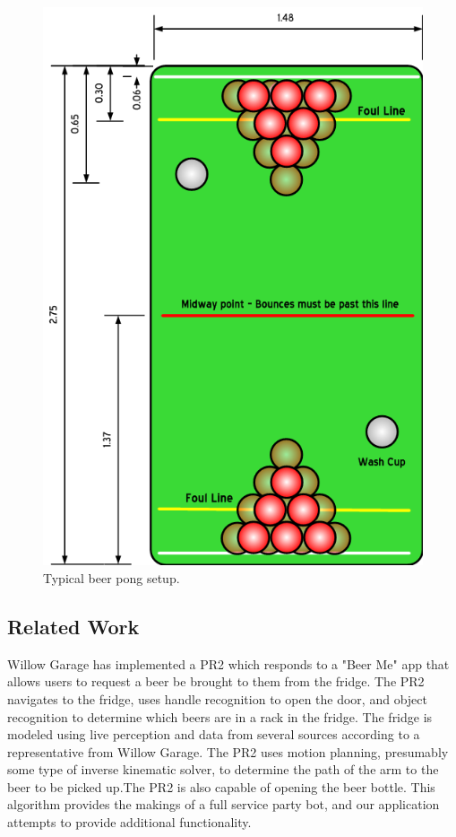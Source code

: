 \documentclass[letterpaper, 10 pt, conference]{ieeeconf}  %
\begin{document}
\begin{figure}[thpb]
      \centering
	  \includegraphics[scale =0.25]{pongtable}
      \caption{Typical beer pong setup.}
      \label{fig:pongtable}
\end{figure}

\subsection{Related Work}

Willow Garage has implemented a PR2 which responds to a "Beer Me" app that allows users to request a beer be brought to them from the fridge. The PR2 navigates to the fridge, uses handle recognition to open the door, and object recognition to determine which beers are in a rack in the fridge. The fridge is modeled using live perception and data from several sources according to a representative from Willow Garage. The PR2  uses motion planning, presumably some type of inverse kinematic solver, to determine the path of the arm to the beer to be picked up.The PR2 is also capable of opening the beer bottle. This algorithm provides the makings of a full service party bot, and our application attempts to provide additional functionality.  
\end{document}
